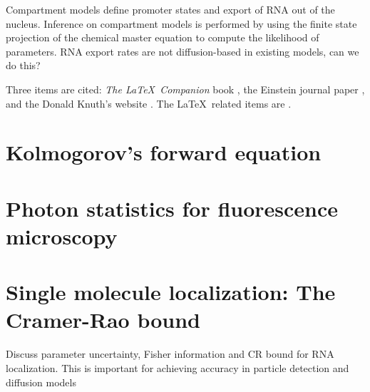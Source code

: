 \documentclass{article}
\begin{document}
Compartment models define promoter states and export of RNA out of the nucleus. Inference on compartment models is performed by using the finite state projection of the chemical master equation to compute the likelihood of parameters. RNA export rates are not diffusion-based in existing models, can we do this?  

Three items are cited: \textit{The \LaTeX\ Companion} book \cite{latexcompanion}, the Einstein journal paper \citet{einstein}, and the 
Donald Knuth's website \cite{knuthwebsite}. The \LaTeX\ related items are
\cite{latexcompanion,knuthwebsite}.  



\appendix

\section{Kolmogorov's forward equation}

\section{Photon statistics for fluorescence microscopy}


\section{Single molecule localization: The Cramer-Rao bound}

Discuss parameter uncertainty, Fisher information and CR bound for RNA localization. This is important for achieving accuracy in particle detection and diffusion models
\end{document}

